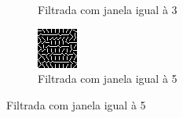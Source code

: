 \documentclass[10pt,a4paper]{article}
\begin{document}
\begin{figure}[!ht]
\begin{subfigure}[ht]{0.20\textwidth}
        \caption{Filtrada com janela igual à 3}
    \end{subfigure}
    \qquad
    \begin{subfigure}[ht]{0.20\textwidth}
        \includegraphics[width=\textwidth]{2_filtered_window_5.jpg}
        \caption{Filtrada com janela igual à 5}
    \end{subfigure}
\end{figure}
\end{document}
